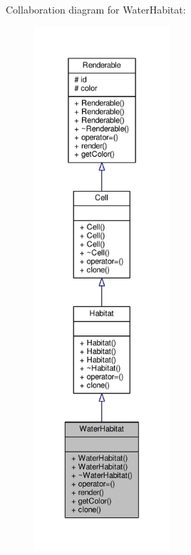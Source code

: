 Collaboration diagram for Water\+Habitat\+:
\nopagebreak
\begin{figure}[H]
\begin{center}
\leavevmode
\includegraphics[height=550pt]{classWaterHabitat__coll__graph}
\end{center}
\end{figure}
